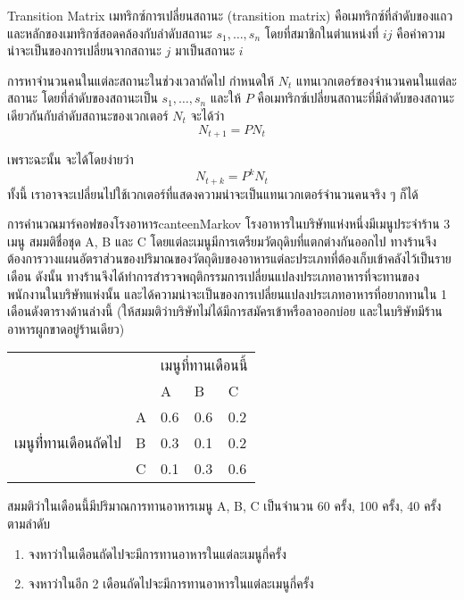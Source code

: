 \begin{definition}
    {Transition Matrix}{}
    เมทริกซ์การเปลี่ยนสถานะ (transition matrix) คือเมทริกซ์ที่ลำดับของแถวและหลักของเมทริกซ์สอดคล้องกับลำดับสถานะ $s_1,\dots,s_n$ โดยที่สมาชิกในตำแหน่งที่ $ij$ คือค่าความน่าจะเป็นของการเปลี่ยนจากสถานะ $j$ มาเป็นสถานะ $i$
\end{definition}

\begin{property}
    {การหาจำนวนคนในแต่ละสถานะในช่วงเวลาถัดไป}{}
    กำหนดให้ $N_t$ แทนเวกเตอร์ของจำนวนคนในแต่ละสถานะ โดยที่ลำดับของสถานะเป็น $s_1,\dots,s_n$ และให้ $P$ คือเมทริกซ์เปลี่ยนสถานะที่มีลำดับของสถานะเดียวกันกับลำดับสถานะของเวกเตอร์ $N_t$ จะได้ว่า
    \[
    N_{t+1} = P N_t
    \]

    เพราะฉะนั้น จะได้โดยง่ายว่า
    \[
    N_{t+k} = P^k N_t
    \]
    ทั้งนี้ เราอาจจะเปลี่ยนไปใช้เวกเตอร์ที่แสดงความน่าจะเป็นแทนเวกเตอร์จำนวนคนจริง ๆ ก็ได้
\end{property}
\newpage
\begin{example}
    {การคำนวณมาร์คอฟของโรงอาหาร}{canteenMarkov}
    โรงอาหารในบริษัทแห่งหนึ่งมีเมนูประจำร้าน 3 เมนู สมมติชื่อชุด A, B และ C โดยแต่ละเมนูมีการเตรียมวัตถุดิบที่แตกต่างกันออกไป ทางร้านจึงต้องการวางแผนอัตราส่วนของปริมาณของวัตถุดิบของอาหารแต่ละประเภทที่ต้องเก็บเข้าคลังไว้เป็นรายเดือน ดังนั้น ทางร้านจึงได้ทำการสำรวจพฤติกรรมการเปลี่ยนแปลงประเภทอาหารที่จะทานของพนักงานในบริษัทแห่งนั้น และได้ความน่าจะเป็นของการเปลี่ยนแปลงประเภทอาหารที่อยากทานใน 1 เดือนดังตารางด้านล่างนี้ (ให้สมมติว่าบริษัทไม่ได้มีการสมัครเข้าหรือลาออกบ่อย และในบริษัทมีร้านอาหารผูกขาดอยู่ร้านเดียว)
    \begin{center}
    \begin{tabular}{ll|lll|}
        \cline{3-5}
                                                                     &   & \multicolumn{3}{l|}{เมนูที่ทานเดือนนี้}                   \\ \cline{3-5} 
                                                                     &   & \multicolumn{1}{l|}{A}   & \multicolumn{1}{l|}{B}   & C   \\ \hline
        \multicolumn{1}{|l|}{\multirow{3}{*}{เมนูที่่ทานเดือนถัดไป}} & A & \multicolumn{1}{l|}{0.6} & \multicolumn{1}{l|}{0.6} & 0.2 \\ \cline{2-5} 
        \multicolumn{1}{|l|}{}                                       & B & \multicolumn{1}{l|}{0.3} & \multicolumn{1}{l|}{0.1} & 0.2 \\ \cline{2-5} 
        \multicolumn{1}{|l|}{}                                       & C & \multicolumn{1}{l|}{0.1} & \multicolumn{1}{l|}{0.3} & 0.6 \\ \hline
    \end{tabular}  
    \end{center}
    สมมติว่าในเดือนนี้มีปริมาณการทานอาหารเมนู A, B, C เป็นจำนวน 60 ครั้ง, 100 ครั้ง, 40 ครั้ง ตามลำดับ
    \begin{enumerate}
        \item จงหาว่าในเดือนถัดไปจะมีการทานอาหารในแต่ละเมนูกี่ครั้ง
        \item จงหาว่าในอีก 2 เดือนถัดไปจะมีการทานอาหารในแต่ละเมนูกี่ครั้ง
    \end{enumerate}
\end{example}

